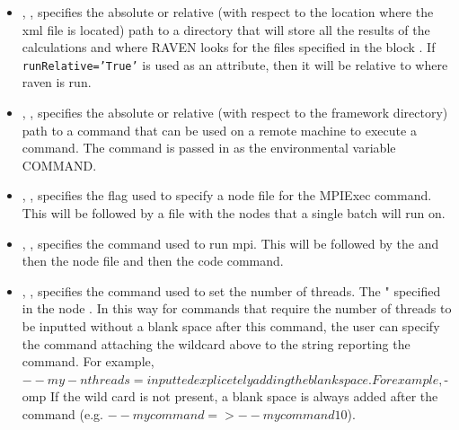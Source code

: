\begin{itemize}
\item {}, ,
  specifies the absolute or relative (with respect to the location
  where the xml file is located) path to a directory that will store
  all the results of the calculations and where RAVEN looks for the
  files specified in the block .  If
  \texttt{runRelative='True'} is used as an attribute, then it will be
  relative to where raven is run.
%


\item {}, ,
  specifies the absolute or relative (with respect to the framework
  directory) path to a command that can be used on a remote machine to
  execute a command.  The command is passed in as the environmental
  variable COMMAND.
%


\item {}, ,
  specifies the flag used to specify a node file for the MPIExec command.  This will be followed by a file with the nodes that a single batch will run on.

\item {}, , specifies the command used to run mpi.  This will be followed by the  and then the node file and then the code command.

\item {}, , specifies the command used to set the
    number of threads. The "%
    specified in the node . In this way for commands
    that require the number of threads to be inputted without a blank space after this command,
    the user can specify the command attaching the wildcard above to the string reporting the command.
    For example, $--my-nthreads=%
    inputted explicetely adding the blank space. For example, $-omp %
    If the wild card is not present, a blank space is always added after the command
    (e.g. $--mycommand => --mycommand 10$).


\end{itemize}
